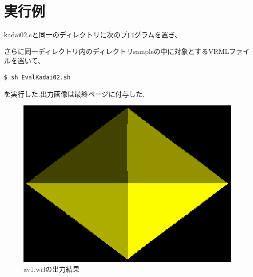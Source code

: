 \documentclass[a4j,dvipdfmx]{jsarticle}
\begin{document}
\section{実行例}
kadai02.cと同一のディレクトリに次のプログラムを置き、

さらに同一ディレクトリ内のディレクトリsampleの中に対象とするVRMLファイルを置いて、
\begin{lstlisting}
$ sh EvalKadai02.sh
\end{lstlisting}
を実行した.出力画像は最終ページに付与した.

\begin{figure}[p]
  \begin{center}
    \includegraphics[clip,scale=0.5]{images/Kadai02ForAv1.eps}
    \caption{av1.wrlの出力結果}
    \label{av1}
  \end{center}
\end{figure}
\end{document}
